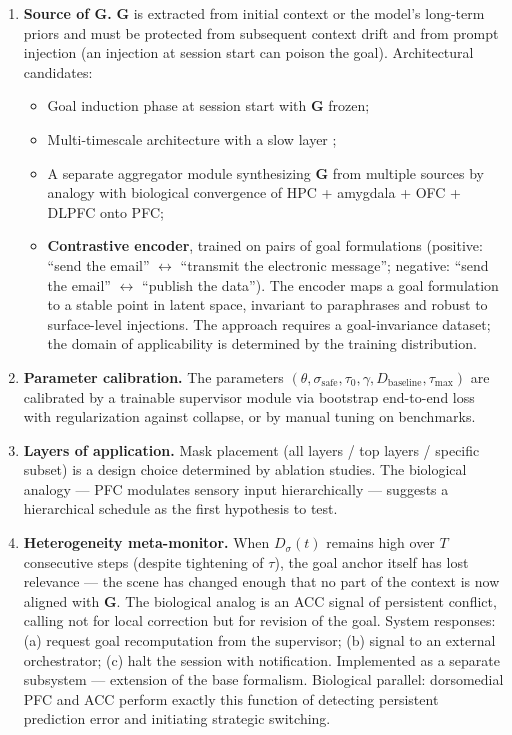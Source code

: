 \documentclass[12pt,a4paper]{article}
\begin{document}
\begin{enumerate}
    \item \textbf{Source of $\mathbf{G}$.} $\mathbf{G}$ is extracted from initial context or the model's long-term priors and must be protected from subsequent context drift and from prompt injection (an injection at session start can poison the goal). Architectural candidates:
    \begin{itemize}
        \item Goal induction phase at session start with $\mathbf{G}$ frozen;
        \item Multi-timescale architecture with a slow layer \cite{yamashita2008};
        \item A separate aggregator module synthesizing $\mathbf{G}$ from multiple sources by analogy with biological convergence of HPC + amygdala + OFC + DLPFC onto PFC;
        \item \textbf{Contrastive encoder}, trained on pairs of goal formulations (positive: ``send the email'' $\leftrightarrow$ ``transmit the electronic message''; negative: ``send the email'' $\leftrightarrow$ ``publish the data''). The encoder maps a goal formulation to a stable point in latent space, invariant to paraphrases and robust to surface-level injections. The approach requires a goal-invariance dataset; the domain of applicability is determined by the training distribution.
    \end{itemize}

    \item \textbf{Parameter calibration.} The parameters $(\theta, \sigma_{\text{safe}}, \tau_0, \gamma, D_{\text{baseline}}, \tau_{\max})$ are calibrated by a trainable supervisor module via bootstrap end-to-end loss with regularization against collapse, or by manual tuning on benchmarks.

    \item \textbf{Layers of application.} Mask placement (all layers / top layers / specific subset) is a design choice determined by ablation studies. The biological analogy --- PFC modulates sensory input hierarchically --- suggests a hierarchical schedule as the first hypothesis to test.

    \item \textbf{Heterogeneity meta-monitor.} When $D_\sigma(t)$ remains high over $T$ consecutive steps (despite tightening of $\tau$), the goal anchor itself has lost relevance --- the scene has changed enough that no part of the context is now aligned with $\mathbf{G}$. The biological analog is an ACC signal of persistent conflict, calling not for local correction but for revision of the goal. System responses: (a) request goal recomputation from the supervisor; (b) signal to an external orchestrator; (c) halt the session with notification. Implemented as a separate subsystem --- extension of the base formalism. Biological parallel: dorsomedial PFC and ACC perform exactly this function of detecting persistent prediction error and initiating strategic switching.


\end{enumerate}
\end{document}
